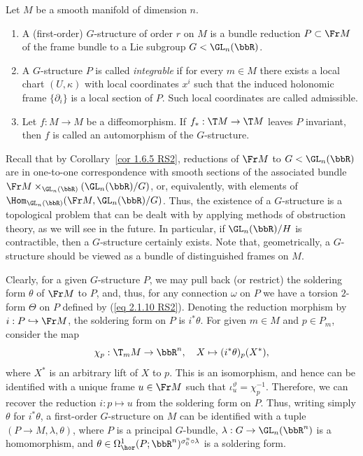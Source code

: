 \begin{defn}
    Let $M$ be a smooth manifold of dimension $n$.
    \begin{enumerate}
        \item A (first-order) $G$-structure of order $r$ on $M$ is a bundle reduction $P\subset \Fr M$ of the frame bundle to a Lie subgroup $G< \GL_n(\bbR)$.
        \item A $G$-structure $P$ is called \emph{integrable} if for every $m\in M$ there exists a local chart $(U,\kappa)$ with local coordinates $x^i$ such that the induced holonomic frame $\{\partial_i\}$ is a local section of $P$. Such local coordinates are called admissible.
        \item Let $f:M\to M$ be a diffeomorphism. If $f_\ast:\T M\to \T M$ leaves $P$ invariant, then $f$ is called an automorphism of the $G$-structure.
    \end{enumerate}
\end{defn}

Recall that by Corollary~\ref{cor 1.6.5 RS2}, reductions of $\Fr M$ to $G<\GL_n(\bbR)$ are in one-to-one correspondence with smooth sections of the associated bundle $\Fr M\times_{\GL_n(\bbR)}(\GL_n(\bbR)\slash G)$, or, equivalently, with elements of $\Hom_{\GL_n(\bbR)}(\Fr M,\GL_n(\bbR)\slash G)$. Thus, the existence of a $G$-structure is a topological problem that can be dealt with by applying methods of obstruction theory, as we will see in the future. In particular, if $\GL_n(\bbR)\slash H$ is contractible, then a $G$-structure certainly exists. Note that, geometrically, a $G$-structure should be viewed as a bundle of distinguished frames on $M$.

\begin{rem}\label{rem G-structure as soldering}
    Clearly, for a given $G$-structure $P$, we may pull back (or restrict) the soldering form $\theta$ of $\Fr M$ to $P$, and, thus, for any connection $\omega$ on $P$ we have a torsion $2$-form $\Theta$ on $P$ defined by (\ref{eq 2.1.10 RS2}). Denoting the reduction morphism by $i:P\hookrightarrow \Fr M$, the soldering form on $P$ is $i^\ast\theta$. For given $m\in M$ and $p\in P_m$, consider the map 
    \[\chi_p:\T_m M\to \bbR^n,\quad X\mapsto (i^\ast\theta)_p(X^\ast),\]
    where $X^\ast$ is an arbitrary lift of $X$ to $p$. This is an isomorphism, and hence can be identified with a unique frame $u\in \Fr M$ such that $\iota_u^\vartheta=\chi_p^{-1}$. Therefore, we can recover the reduction $i:p\mapsto u$ from the soldering form on $P$. Thus, writing simply $\theta$ for $i^\ast\theta$, a first-order $G$-structure on $M$ can be identified with a tuple $(P\to M,\lambda,\theta)$, where $P$ is a principal $G$-bundle, $\lambda:G\to \GL_n(\bbR^n)$ is a homomorphism, and $\theta\in \Omega^1_{\hor}(P;\bbR^n)^{\sigma_0^n\circ\lambda}$ is a soldering form.
\end{rem}

